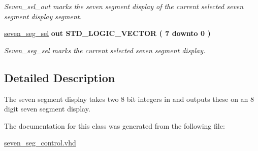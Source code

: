 \begin{DoxyCompactItemize}
\begin{DoxyCompactList}\small\item\em Seven\-\_\-sel\-\_\-out marks the seven segment display of the current selected seven segment display segment. \end{DoxyCompactList}\item 
\hypertarget{classseven__seg__control_ae1646bd2ce2b0e1d1bb85bf2a88d1b5f}{\hyperlink{classseven__seg__control_ae1646bd2ce2b0e1d1bb85bf2a88d1b5f}{seven\-\_\-seg\-\_\-sel}  {\bfseries {\bfseries \textcolor{vhdlkeyword}{out}\textcolor{vhdlchar}{ }}} {\bfseries \textcolor{comment}{S\-T\-D\-\_\-\-L\-O\-G\-I\-C\-\_\-\-V\-E\-C\-T\-O\-R}\textcolor{vhdlchar}{ }\textcolor{vhdlchar}{(}\textcolor{vhdlchar}{ }\textcolor{vhdlchar}{ } \textcolor{vhdldigit}{7} \textcolor{vhdlchar}{ }\textcolor{vhdlchar}{ }\textcolor{vhdlchar}{ }\textcolor{vhdlkeyword}{downto}\textcolor{vhdlchar}{ }\textcolor{vhdlchar}{ }\textcolor{vhdlchar}{ } \textcolor{vhdldigit}{0} \textcolor{vhdlchar}{ }\textcolor{vhdlchar}{)}\textcolor{vhdlchar}{ }} }\label{classseven__seg__control_ae1646bd2ce2b0e1d1bb85bf2a88d1b5f}

\begin{DoxyCompactList}\small\item\em Seven\-\_\-seg\-\_\-sel marks the current selected seven segment display. \end{DoxyCompactList}\end{DoxyCompactItemize}


\subsection{Detailed Description}
The seven segment display takes two 8 bit integers in and outputs these on an 8 digit seven segment display. 

The documentation for this class was generated from the following file\-:\begin{DoxyCompactItemize}
\item 
\hyperlink{seven__seg__control_8vhd}{seven\-\_\-seg\-\_\-control.\-vhd}\end{DoxyCompactItemize}
